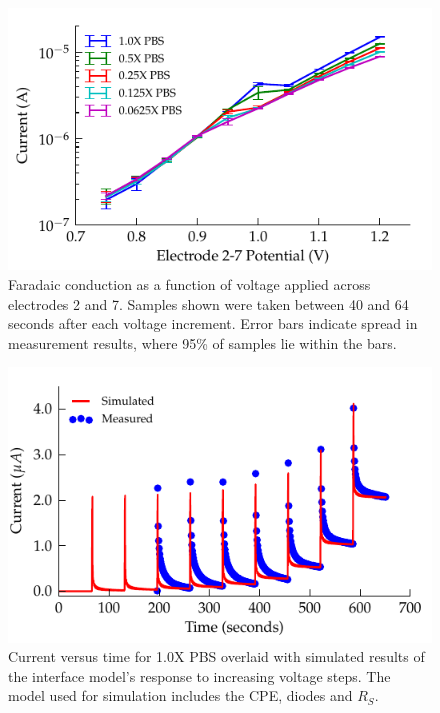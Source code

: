 \documentclass[journal, a4paper]{IEEEtran}
\begin{document}
{\begin{figure}
    \begin{center}
        \includegraphics{graphics/currentVoltage_logY_IEEE}
    \end{center}
    \caption{Faradaic conduction as a function of voltage applied across electrodes 2 and 7. Samples shown were taken between 40 and 64 seconds after each voltage increment. Error bars indicate spread in measurement results, where 95\% of samples lie within the bars.}
    \label{fig:faradaic_logCurrentVsVoltage}
\end{figure}

\begin{figure}
    \begin{center}
        \includegraphics{graphics/faradaic_currentVsTimeIEEE}
    \end{center}
    \caption{Current versus time for 1.0X PBS overlaid with simulated results of the interface model's response to increasing voltage steps. The model used for simulation includes the CPE, diodes and $R_{S}$.}
    \label{fig:faradaic_currentVsTime}
\end{figure}

}
\end{document}
